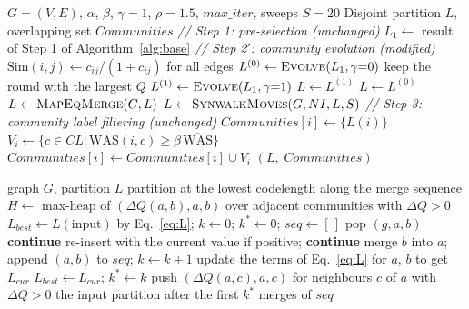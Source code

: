 \documentclass[conference]{IEEEtran}
\newcommand{\algcomment}[1]{\Statex \textit{// #1}}
\begin{document}
\begin{algorithm}[!t]
\footnotesize
\caption{Proposed pipeline (M1--M6)}\label{alg:ours}
\begin{algorithmic}[1]
\Require $G=(V,E)$, $\alpha$, $\beta$, $\gamma{=}1$, $\rho{=}1.5$, $max\_iter$, sweeps $S{=}20$
\Ensure Disjoint partition $L$, overlapping set $Communities$
\algcomment{Step 1: pre-selection (unchanged)}
\State $L_1\gets$ result of Step 1 of Algorithm~\ref{alg:base}
\algcomment{Step 2$'$: community evolution (modified)}
\State $\mathrm{Sim}(i,j)\gets c_{ij}/(1+c_{ij})$ for all edges 
\State $L^{(0)}\gets\textsc{Evolve}(L_1,\gamma{=}0)$ 
\State \hspace{\algorithmicindent}keep the round with the largest $Q$ 
\State $L^{(1)}\gets\textsc{Evolve}(L_1,\gamma{=}1)$ 
 
  \State $L\gets L^{(1)}$
\Else
  \State $L\gets L^{(0)}$
\EndIf
\State $L\gets\textsc{MapEqMerge}(G,L)$ 
\State $L\gets\textsc{SynwalkMoves}(G,NI,L,S)$ 
\algcomment{Step 3: community label filtering (unchanged)}
 $Communities[i]\gets\{L(i)\}$ \EndFor
{}
  \State $V_i\gets\{c\in CL:\mathrm{WAS}(i,c)\ge\beta\,\overline{\mathrm{WAS}}\}$
  \State $Communities[i]\gets Communities[i]\cup V_i$
\EndFor
\State \Return $(L,\;Communities)$
\end{algorithmic}
\end{algorithm}

\begin{algorithm}[!t]
\footnotesize
\caption{\textsc{MapEqMerge}$(G,L)$ (M5)}\label{alg:merge}
\begin{algorithmic}[1]
\Require graph $G$, partition $L$
\Ensure partition at the lowest codelength along the merge sequence
\State $H\gets$ max-heap of $(\Delta Q(a,b),a,b)$ over adjacent communities with $\Delta Q>0$
\State $L_{best}\gets L(\text{input})$ by Eq.~\eqref{eq:L}; $k\gets0$; $k^{*}\gets0$; $seq\gets[\,]$
  \State pop $(g,a,b)$
   \textbf{continue} \EndIf
    \State re-insert with the current value if positive; \textbf{continue}
  \EndIf
  \State merge $b$ into $a$; append $(a,b)$ to $seq$; $k\gets k+1$
  \State update the terms of Eq.~\eqref{eq:L} for $a$, $b$ to get $L_{cur}$
    \State $L_{best}\gets L_{cur}$; $k^{*}\gets k$
  \EndIf
  \State push $(\Delta Q(a,c),a,c)$ for neighbours $c$ of $a$ with $\Delta Q>0$
\EndWhile
\State \Return the input partition after the first $k^{*}$ merges of $seq$
\end{algorithmic}
\end{algorithm}
\end{document}
